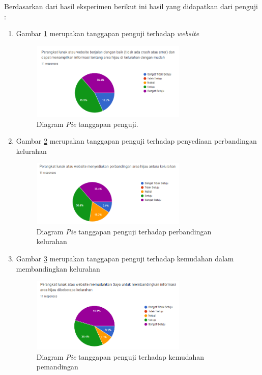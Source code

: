 Berdasarkan dari hasil eksperimen berikut ini hasil yang didapatkan dari penguji :
\begin{enumerate}
	\item Gambar \ref{fig:respon1} merupakan tanggapan penguji terhadap \textit{website}\\
	\begin{figure}[H]
		\centering
		\includegraphics[width=0.7\textwidth]{Gambar/respon1.png}
		\caption{Diagram \textit{Pie} tanggapan penguji.}
		\label{fig:respon1}
	\end{figure}
	
	\item Gambar \ref{fig:respon2} merupakan tanggapan penguji terhadap penyediaan perbandingan kelurahan\\
	\begin{figure}[H]
		\centering
		\includegraphics[width=0.7\textwidth]{Gambar/respon2.png}
		\caption{Diagram \textit{Pie} tanggapan penguji terhadap perbandingan kelurahan}
		\label{fig:respon2}
	\end{figure}
	
	\item Gambar \ref{fig:respon3} merupakan tanggapan penguji terhadap kemudahan dalam membandingkan kelurahan\\
	\begin{figure}[H]
		\centering
		\includegraphics[width=0.7\textwidth]{Gambar/respon3.png}
		\caption{Diagram \textit{Pie} tanggapan penguji terhadap kemudahan pemandingan}
		\label{fig:respon3}
	\end{figure}
	

\end{enumerate}
